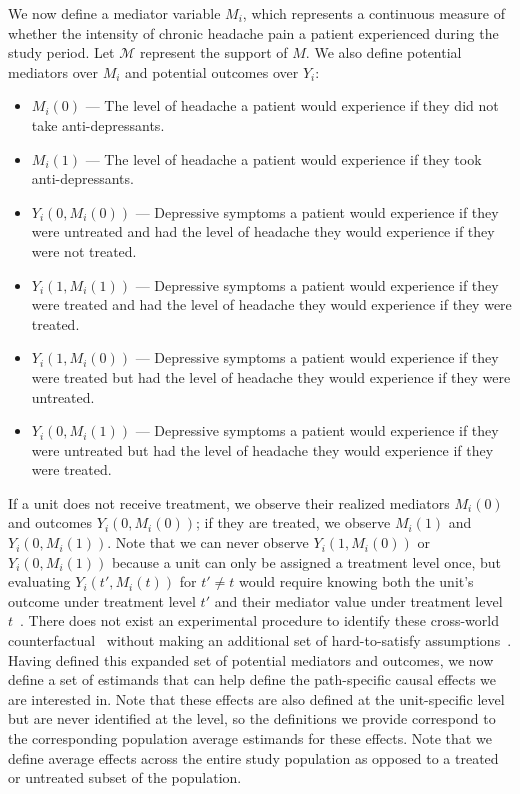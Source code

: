 We now define a mediator variable $M_{i}$, which represents a continuous measure of whether the intensity of chronic
headache pain a patient experienced during the study period. Let $\mathcal{M}$ represent the support of $M$. 
We also define potential mediators over $M_{i}$ and potential outcomes over $Y_{i}$:
\begin{itemize}[noitemsep,topsep=0pt]
	\item $M_{i}(0)$ --- The level of headache a patient would experience if they did not take anti-depressants.
	\item $M_{i}(1)$ --- The level of headache a patient would experience if they took anti-depressants.
	\item $Y_{i}(0,M_{i}(0))$ --- Depressive symptoms a patient would experience if they were untreated and had 
	the level of headache they would experience if they were not treated. 
	\item $Y_{i}(1,M_{i}(1))$ --- Depressive symptoms a patient would experience if they were treated and had 
	the level of headache they would experience if they were treated. 
	\item $Y_{i}(1,M_{i}(0))$ --- Depressive symptoms a patient would experience if they were treated but had 
	the level of headache they would experience if they were untreated.
	\item $Y_{i}(0,M_{i}(1))$ --- Depressive symptoms a patient would experience if they were untreated but had 
	the level of headache they would experience if they were treated.
\end{itemize}

If a unit does not receive treatment, we observe their realized mediators $M_{i}(0)$ and outcomes $Y_{i}(0,M_{i}(0))$;
if they are treated, we observe $M_{i}(1)$ and $Y_{i}(0,M_{i}(1))$. Note that we can never observe $Y_{i}(1,M_{i}(0))$ or
$Y_{i}(0,M_{i}(1))$ because a unit can only be assigned a treatment level once, but evaluating $Y_{i}(t',M_{i}(t))$ for 
$t' \neq t$ would require knowing both the unit's outcome under treatment level $t'$ and their mediator value under
treatment level $t$~\citep{robinsgreenland1992}. There does not exist an experimental procedure to identify 
these cross-world counterfactual~\citep{pearl2001} without making an additional set of hard-to-satisfy 
assumptions~\citep{imaietal2013}. Having defined this expanded set of potential mediators and outcomes, we
now define a set of estimands that can help define the path-specific causal effects we are interested in. Note that 
these effects are also defined at the unit-specific level but are never identified at the level, so the 
definitions we provide correspond to the corresponding population average estimands for these effects. Note that
we define average effects across the entire study population as opposed to a treated or untreated subset of the 
population. 

